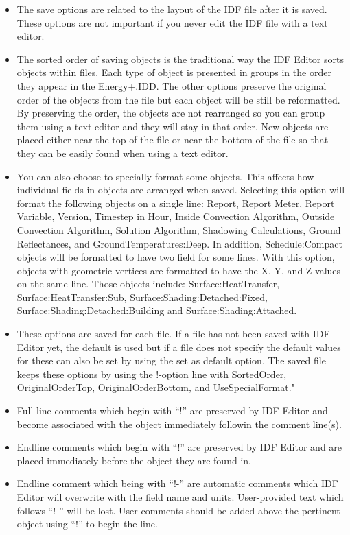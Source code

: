 \begin{itemize}
\item
  The save options are related to the layout of the IDF file after it is saved. These options are not important if you never edit the IDF file with a text editor.
\item
  The sorted order of saving objects is the traditional way the IDF Editor sorts objects within files. Each type of object is presented in groups in the order they appear in the Energy+.IDD. The other options preserve the original order of the objects from the file but each object will be still be reformatted. By preserving the order, the objects are not rearranged so you can group them using a text editor and they will stay in that order. New objects are placed either near the top of the file or near the bottom of the file so that they can be easily found when using a text editor.
\item
  You can also choose to specially format some objects. This affects how individual fields in objects are arranged when saved. Selecting this option will format the following objects on a single line: Report, Report Meter, Report Variable, Version, Timestep in Hour, Inside Convection Algorithm, Outside Convection Algorithm, Solution Algorithm, Shadowing Calculations, Ground Reflectances, and GroundTemperatures:Deep. In addition, Schedule:Compact objects will be formatted to have two field for some lines. With this option, objects with geometric vertices are formatted to have the X, Y, and Z values on the same line. Those objects include: Surface:HeatTransfer, Surface:HeatTransfer:Sub, Surface:Shading:Detached:Fixed, Surface:Shading:Detached:Building and Surface:Shading:Attached.
\item
  These options are saved for each file. If a file has not been saved with IDF Editor yet, the default is used but if a file does not specify the default values for these can also be set by using the set as default option. The saved file keeps these options by using the !-option line with SortedOrder, OriginalOrderTop, OriginalOrderBottom, and UseSpecialFormat."
\item
  Full line comments which begin with ``!'' are preserved by IDF Editor and become associated with the object immediately followin the comment line(s).
\item
  Endline comments which begin with ``!'' are preserved by IDF Editor and are placed immediately before the object they are found in.
\item
  Endline comment which being with ``!-'' are automatic comments which IDF Editor will overwrite with the field name and units. User-provided text which follows ``!-'' will be lost. User comments should be added above the pertinent object using ``!'' to begin the line.
\end{itemize}


